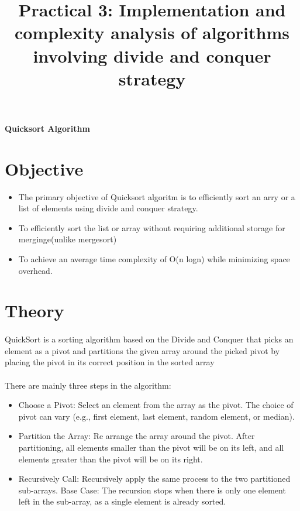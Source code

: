 \documentclass{article}
\author{}
\date{}
\title{\textbf{Practical 3: Implementation and complexity analysis of algorithms involving divide and conquer strategy}}
\begin{document}
\maketitle

\vspace{0.1mm}
\begin{center}
    \LARGE\textbf{Quicksort Algorithm}\end{center}


{\normalsize
\section*{Objective}
\begin{itemize}
    \item The primary objective of Quicksort algoritm is to efficiently sort an arry or a list of elements using divide and conquer strategy.
    \item To efficiently sort the list or array without requiring additional storage for merginge(unlike mergesort)
    \item To achieve an average time complexity of O(n logn) while minimizing space overhead.
\end{itemize}

\section*{Theory}
\paragraph{} 
QuickSort is a sorting algorithm based on the Divide and Conquer that picks an element as a pivot and partitions the given array around the picked pivot by placing the pivot in its correct position in the sorted array
\paragraph{}
There are mainly three steps in the algorithm:
\begin{itemize}
    \item Choose a Pivot: Select an element from the array as the pivot. The choice of pivot can vary (e.g., first element, last element, random element, or median).
    \item Partition the Array: Re arrange the array around the pivot. After partitioning, all elements smaller than the pivot will be on its left, and all elements greater than the pivot will be on its right.
    \item Recursively Call: Recursively apply the same process to the two partitioned sub-arrays.
Base Case: The recursion stops when there is only one element left in the sub-array, as a single element is already sorted.
\end{itemize}
\pagebreak
}
\end{document}
